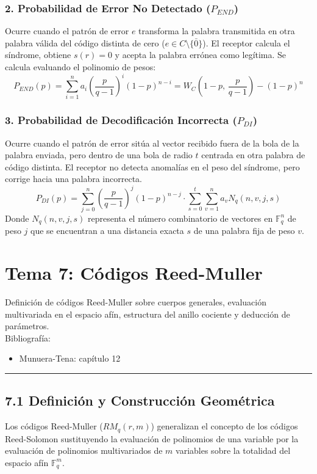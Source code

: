 \documentclass{article}
\newcommand{\hlinecolor}{\noindent\textcolor{azuloscuro}{\rule{\textwidth}{1pt}}}
\begin{document}
\subsubsection{2. Probabilidad de Error No Detectado ($P_{END}$)}
Ocurre cuando el patrón de error $e$ transforma la palabra transmitida en otra palabra válida del código distinta de cero ($e \in C \setminus \{\bar{0}\}$). El receptor calcula el síndrome, obtiene $s(r) = 0$ y acepta la palabra errónea como legítima. Se calcula evaluando el polinomio de pesos:
\[
P_{END}(p) = \sum_{i=1}^n a_i \left(\frac{p}{q-1}\right)^i (1-p)^{n-i} = W_C\left(1-p, \, \frac{p}{q-1}\right) - (1-p)^n
\]

\subsubsection{3. Probabilidad de Decodificación Incorrecta ($P_{DI}$)}
Ocurre cuando el patrón de error sitúa al vector recibido fuera de la bola de la palabra enviada, pero dentro de una bola de radio $t$ centrada en otra palabra de código distinta. El receptor no detecta anomalías en el peso del síndrome, pero corrige hacia una palabra incorrecta.
\[
P_{DI}(p) = \sum_{j=0}^n \left( \frac{p}{q-1} \right)^j (1-p)^{n-j} \cdot \sum_{s=0}^t \sum_{v=1}^n a_{v} N_{q}(n,v,j,s)
\]
Donde $N_q(n,v,j,s)$ representa el número combinatorio de vectores en $\mathbb{F}_q^n$ de peso $j$ que se encuentran a una distancia exacta $s$ de una palabra fija de peso $v$.

\newpage
\section{Tema 7: Códigos Reed-Muller}
Definición de códigos Reed-Muller sobre cuerpos generales, evaluación multivariada en el espacio afín, estructura del anillo cociente y deducción de parámetros.\\
Bibliografía:
\begin{itemize}
\item Munuera-Tena: capítulo 12
\end{itemize}
\hlinecolor{}
\vspace{0.5cm}

\subsection{7.1 Definición y Construcción Geométrica}

Los códigos Reed-Muller ($RM_q(r,m)$) generalizan el concepto de los códigos Reed-Solomon sustituyendo la evaluación de polinomios de una variable por la evaluación de polinomios multivariados de $m$ variables sobre la totalidad del espacio afín $\mathbb{F}_q^m$. 
\end{document}

